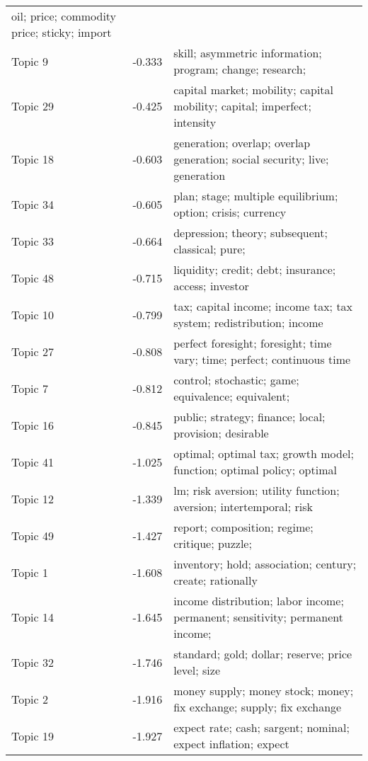 \documentclass[
  12pt,
  onecolumn]{article}
\begin{document}
\begin{longtable}[t]{>{}l>{}r>{\raggedright\arraybackslash}m{25em}}
oil;
price;
commodity
price;
sticky;
import\\
Topic 9 & -0.333 & skill;
asymmetric
information;
program;
change;
research;
\cellcolor{gray!6}{complementarity}\\
Topic 29 & -0.425 & capital
market;
mobility;
capital
mobility;
capital;
imperfect;
intensity\\
Topic 18 & -0.603 & generation;
overlap;
overlap
generation;
social
security;
live;
generation
\cellcolor{gray!6}{model}\\
\addlinespace
Topic 34 & -0.605 & plan;
stage;
multiple
equilibrium;
option;
crisis;
currency\\
Topic 33 & -0.664 & depression;
theory;
subsequent;
classical;
pure;
\cellcolor{gray!6}{principle}\\
Topic 48 & -0.715 & liquidity;
credit;
debt;
insurance;
access;
investor\\
Topic 10 & -0.799 & tax;
capital
income;
income
tax;
tax
system;
redistribution;
income
\cellcolor{gray!6}{taxation}\\
Topic 27 & -0.808 & perfect
foresight;
foresight;
time
vary;
time;
perfect;
continuous
time\\
\addlinespace
Topic 7 & -0.812 & control;
stochastic;
game;
equivalence;
equivalent;
\cellcolor{gray!6}{solution}\\
Topic 16 & -0.845 & public;
strategy;
finance;
local;
provision;
desirable\\
Topic 41 & -1.025 & optimal;
optimal
tax;
growth
model;
function;
optimal
policy;
optimal
\cellcolor{gray!6}{taxation}\\
Topic 12 & -1.339 & lm;
risk
aversion;
utility
function;
aversion;
intertemporal;
risk\\
Topic 49 & -1.427 & report;
composition;
regime;
critique;
puzzle;
\cellcolor{gray!6}{profit}\\
\addlinespace
Topic 1 & -1.608 & inventory;
hold;
association;
century;
create;
rationally\\
Topic 14 & -1.645 & income
distribution;
labor
income;
permanent;
sensitivity;
permanent
income;
\cellcolor{gray!6}{income}\\
Topic 32 & -1.746 & standard;
gold;
dollar;
reserve;
price
level;
size\\
Topic 2 & -1.916 & money
supply;
money
stock;
money;
fix
exchange;
supply;
fix
exchange
\cellcolor{gray!6}{rate}\\
Topic 19 & -1.927 & expect
rate;
cash;
sargent;
nominal;
expect
inflation;
expect\\*
\end{longtable}
\endgroup{}
\end{document}
